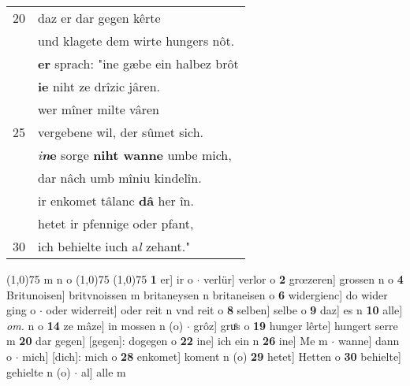 \documentclass[8pt,a4paper,notitlepage]{article}
\begin{document}
\begin{table}[ht]
\begin{minipage}[t]{0.5\linewidth}
\begin{tabular}{rl}
20 & daz er dar gegen kêrte\\ 
 & und klagete dem wirte hungers nôt.\\ 
 & \textbf{er} sprach: "ine gæbe ein halbez brôt\\ 
 & \textbf{ie} niht ze drîzic jâren.\\ 
 & wer mîner milte vâren\\ 
25 & vergebene wil, der sûmet sich.\\ 
 & \textit{i}\textbf{\textit{n}e} sorge \textbf{niht wanne} umbe mich,\\ 
 & dar nâch umb mîniu kindelîn.\\ 
 & ir enkomet tâlanc \textbf{dâ} her în.\\ 
 & hetet ir pfennige oder pfant,\\ 
30 & ich behielte iuch a\textit{l} zehant."\\ 
\end{tabular}
\scriptsize
\line(1,0){75} \newline
m n o \newline
\line(1,0){75} \newline
\newline
\line(1,0){75} \newline
\textbf{1} er] ir o  $\cdot$ verlür] verlor o \textbf{2} grœzeren] grossen n o \textbf{4} Britunoisen] britvnoissen m britaneysen n britaneisen o \textbf{6} widergienc] do wider ging o  $\cdot$ oder widerreit] oder reit n vnd reit o \textbf{8} selben] selbe o \textbf{9} daz] es n \textbf{10} alle] \textit{om.} n o \textbf{14} ze mâze] in mossen n (o)  $\cdot$ grôz] gruͦs o \textbf{19} hunger lêrte] hungert serre m \textbf{20} dar gegen] [gegen]: dogegen o \textbf{22} ine] ich ein n \textbf{26} ine] Me m  $\cdot$ wanne] dann o  $\cdot$ mich] [dich]: mich o \textbf{28} enkomet] koment n (o) \textbf{29} hetet] Hetten o \textbf{30} behielte] gehielte n (o)  $\cdot$ al] alle m \newline
\end{minipage}
\end{table}
\newpage
\end{document}

